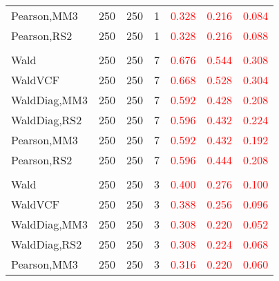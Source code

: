 \documentclass[
]{article}
\begin{document}
\begin{table}[H]
{\begin{tabular}[t]{lrrrrrr}
\hspace{1em}Pearson,MM3 & 250 & 250 & 1 & \textcolor{red}{0.328} & \textcolor{red}{0.216} & \textcolor{red}{0.084}\\
\hspace{1em}Pearson,RS2 & 250 & 250 & 1 & \textcolor{red}{0.328} & \textcolor{red}{0.216} & \textcolor{red}{0.088}\\
\addlinespace[0.3em]
\multicolumn{7}{l}{\textbf{1F 15V}}\\
\hspace{1em}Wald & 250 & 250 & 7 & \textcolor{red}{0.676} & \textcolor{red}{0.544} & \textcolor{red}{0.308}\\
\hspace{1em}WaldVCF & 250 & 250 & 7 & \textcolor{red}{0.668} & \textcolor{red}{0.528} & \textcolor{red}{0.304}\\
\hspace{1em}WaldDiag,MM3 & 250 & 250 & 7 & \textcolor{red}{0.592} & \textcolor{red}{0.428} & \textcolor{red}{0.208}\\
\hspace{1em}WaldDiag,RS2 & 250 & 250 & 7 & \textcolor{red}{0.596} & \textcolor{red}{0.432} & \textcolor{red}{0.224}\\
\hspace{1em}Pearson,MM3 & 250 & 250 & 7 & \textcolor{red}{0.592} & \textcolor{red}{0.432} & \textcolor{red}{0.192}\\
\hspace{1em}Pearson,RS2 & 250 & 250 & 7 & \textcolor{red}{0.596} & \textcolor{red}{0.444} & \textcolor{red}{0.208}\\
\addlinespace[0.3em]
\multicolumn{7}{l}{\textbf{2F 10V}}\\
\hspace{1em}Wald & 250 & 250 & 3 & \textcolor{red}{0.400} & \textcolor{red}{0.276} & \textcolor{red}{0.100}\\
\hspace{1em}WaldVCF & 250 & 250 & 3 & \textcolor{red}{0.388} & \textcolor{red}{0.256} & \textcolor{red}{0.096}\\
\hspace{1em}WaldDiag,MM3 & 250 & 250 & 3 & \textcolor{red}{0.308} & \textcolor{red}{0.220} & \textcolor{red}{0.052}\\
\hspace{1em}WaldDiag,RS2 & 250 & 250 & 3 & \textcolor{red}{0.308} & \textcolor{red}{0.224} & \textcolor{red}{0.068}\\
\hspace{1em}Pearson,MM3 & 250 & 250 & 3 & \textcolor{red}{0.316} & \textcolor{red}{0.220} & \textcolor{red}{0.060}\\

\end{tabular}}
\end{table}
\end{document}

